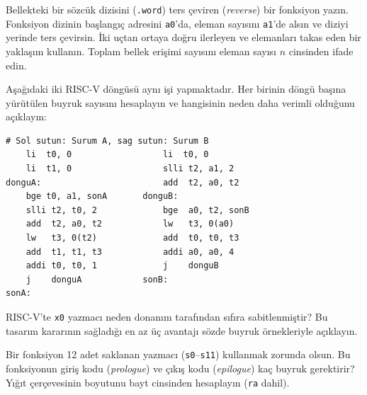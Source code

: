 \begin{alistirma}[\zor]
Bellekteki bir sözcük dizisini (\texttt{.word}) ters çeviren (\emph{reverse}) bir fonksiyon yazın. Fonksiyon dizinin başlangıç adresini \texttt{a0}'da, eleman sayısını \texttt{a1}'de alsın ve diziyi yerinde ters çevirsin. İki uçtan ortaya doğru ilerleyen ve elemanları takas eden bir yaklaşım kullanın. Toplam bellek erişimi sayısını eleman sayısı $n$ cinsinden ifade edin.
\end{alistirma}

\begin{alistirma}[\zor]
Aşağıdaki iki RISC-V döngüsü aynı işi yapmaktadır. Her birinin döngü başına yürütülen buyruk sayısını hesaplayın ve hangisinin neden daha verimli olduğunu açıklayın:
\begin{lstlisting}[style=riscv]
# Sol sutun: Surum A, sag sutun: Surum B
    li  t0, 0                  li  t0, 0
    li  t1, 0                  slli t2, a1, 2
donguA:                        add  t2, a0, t2
    bge t0, a1, sonA       donguB:
    slli t2, t0, 2             bge  a0, t2, sonB
    add  t2, a0, t2            lw   t3, 0(a0)
    lw   t3, 0(t2)             add  t0, t0, t3
    add  t1, t1, t3            addi a0, a0, 4
    addi t0, t0, 1             j    donguB
    j    donguA            sonB:
sonA:
\end{lstlisting}
\end{alistirma}

\begin{alistirma}[\kolay]
RISC-V'te \texttt{x0} yazmacı neden donanım tarafından sıfıra sabitlenmiştir? Bu tasarım kararının sağladığı en az üç avantajı sözde buyruk örnekleriyle açıklayın.
\end{alistirma}

\begin{alistirma}[\orta]
Bir fonksiyon 12 adet saklanan yazmacı (\texttt{s0}--\texttt{s11}) kullanmak zorunda olsun. Bu fonksiyonun giriş kodu (\emph{prologue}) ve çıkış kodu (\emph{epilogue}) kaç buyruk gerektirir? Yığıt çerçevesinin boyutunu bayt cinsinden hesaplayın (\texttt{ra} dahil).
\end{alistirma}
